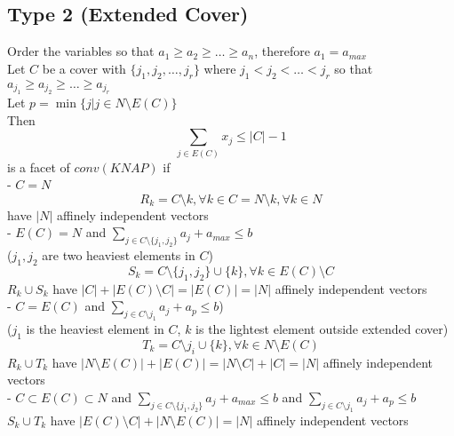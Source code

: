 			\subsection{Type 2 (Extended Cover)}
				Order the variables so that $a_1 \ge a_2 \ge \dots \ge a_n$, therefore $a_1 = a_{max}$\\
				Let $C$ be a cover with $\{j_1, j_2, \dots, j_r\}$ where $j_1 < j_2 < \dots < j_r$ so that $a_{j_1} \ge a_{j_2} \ge \dots \ge a_{j_r}$\\
				Let $p = \min\{j | j\in N \setminus E(C)\}$\\
				Then
				\begin{equation}
					\sum_{j\in E(C)} x_j \le |C| - 1 
				\end{equation}
				is a facet of $conv(KNAP)$ if\\
				- $C = N$\\
				\begin{equation}
					R_k = C\setminus k, \forall k \in C = N \setminus k, \forall k \in N 
				\end{equation}
				have $|N|$ affinely independent vectors\\
				- $E(C) = N$ and $\sum_{j\in C \setminus \{j_1, j_2\}} a_j + a_{max} \le b$\\
				 ($j_1, j_2$ are two heaviest elements in $C$)
				\begin{equation}
					S_k = C\setminus \{j_1, j_2\}\cup \{k\}, \forall k\in E(C)\setminus C 
				\end{equation}
				$R_k\cup S_k$ have $|C|+|E(C) \setminus C| = |E(C)| = |N|$ affinely independent vectors\\
				- $C = E(C)$ and $\sum_{j\in C \setminus j_1} a_j + a_p \le b$)\\
				 ($j_1$ is the heaviest element in $C$, $k$ is the lightest element outside extended cover)
				\begin{equation}
					T_k = C \setminus j_i \cup \{k\}, \forall k\in N\setminus E(C) 
				\end{equation}
				$R_k \cup T_k$ have $|N \setminus E(C)| + |E(C)| = |N\setminus C| + |C| = |N|$ affinely independent vectors\\
				- $C \subset E(C) \subset N$ and $\sum_{j\in C \setminus \{j_1, j_2\}} a_j + a_{max} \le b$ and $\sum_{j\in C \setminus j_1} a_j + a_p \le b$\\
				$S_k \cup T_k$ have $|E(C) \setminus C| + |N \setminus E(C)| = |N|$ affinely independent vectors

